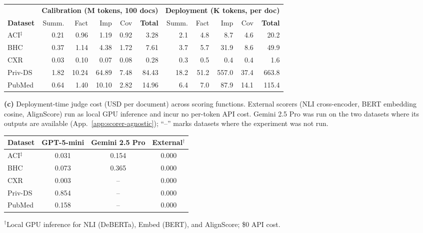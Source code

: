 \begin{table}[!t]
\begin{tabular}{l rrrrr rrrrr}
\toprule
& \multicolumn{5}{c}{\textbf{Calibration (M tokens, 100 docs)}} & \multicolumn{5}{c}{\textbf{Deployment (K tokens, per doc)}} \\
\cmidrule(lr){2-6} \cmidrule(lr){7-11}
\textbf{Dataset} & Summ. & Fact & Imp & Cov & \textbf{Total} & Summ. & Fact & Imp & Cov & \textbf{Total} \\
\midrule
ACI$^\ddagger$ & 0.21 & 0.96 & 1.19 & 0.92 & 3.28 & 2.1 & 4.8 & 8.7 & 4.6 & 20.2 \\
BHC & 0.37 & 1.14 & 4.38 & 1.72 & 7.61 & 3.7 & 5.7 & 31.9 & 8.6 & 49.9 \\
CXR & 0.03 & 0.10 & 0.07 & 0.08 & 0.28 & 0.3 & 0.5 & 0.4 & 0.4 & 1.6 \\
Priv-DS & 1.82 & 10.24 & 64.89 & 7.48 & 84.43 & 18.2 & 51.2 & 557.0 & 37.4 & 663.8 \\
PubMed & 0.64 & 1.40 & 10.10 & 2.82 & 14.96 & 6.4 & 7.0 & 87.9 & 14.1 & 115.4 \\
\bottomrule
\end{tabular}
\par\vspace{1.5em}
\textbf{(c)} Deployment-time judge cost (USD per document) across scoring functions.
External scorers (NLI cross-encoder, BERT embedding cosine, AlignScore) run as local GPU inference and incur no per-token API cost. Gemini 2.5 Pro was run on the two datasets where its outputs are available (App.~\ref{app:scorer-agnostic}); ``--'' marks datasets where the experiment was not run.
\vspace{0.3em}

\begin{tabular}{l c c c}
\toprule
\textbf{Dataset} & GPT-5-mini & Gemini 2.5 Pro & External$^{\dagger}$ \\
\midrule
ACI$^\ddagger$ & 0.031 & 0.154 & 0.000 \\
BHC & 0.073 & 0.365 & 0.000 \\
CXR & 0.003 & -- & 0.000 \\
Priv-DS & 0.854 & -- & 0.000 \\
PubMed & 0.158 & -- & 0.000 \\
\bottomrule
\end{tabular}
\par\vspace{0.2em}
\footnotesize $^{\dagger}$Local GPU inference for NLI (DeBERTa), Embed (BERT), and AlignScore; \$0 API cost.
\end{table}
